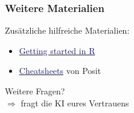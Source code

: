 \documentclass[xcolor=dvipsnames,class=article,a4paper]{beamer}
\begin{document}
\begin{frame}
\frametitle{Weitere Materialien}
Zusätzliche hilfreiche Materialien:
\begin{itemize}
  \item \href{https://github.com/saghirb/Getting-Started-in-R}{\textcolor{MidnightBlue}{Getting started in R}}
  \item \href{https://posit.co/resources/cheatsheets/}{\textcolor{MidnightBlue}{Cheatsheets}} von Posit
\end{itemize}
\bigskip \bigskip \bigskip
\begin{center}
{\Large Weitere Fragen?}
\\[0.5cm]
$\Rightarrow$ fragt die KI eures Vertrauens
\end{center}
\end{frame}
\end{document}
